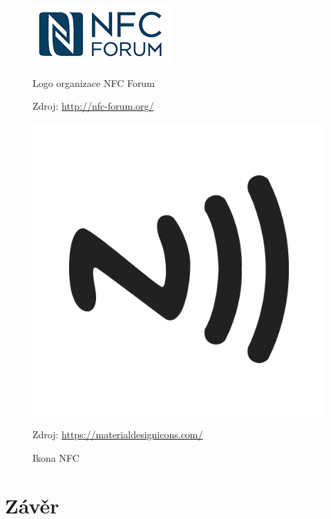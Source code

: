 \documentclass{article}
\begin{document}
\begin{figure}[H]
\begin{minipage}{.5\textwidth}
\centering
                \includegraphics[scale=0.4]{img/nfc-forum-logo.png}
        \caption{Logo organizace NFC Forum}
        \label{fig:nfcforumlogo}
        \centering Zdroj: \url{http://nfc-forum.org/}
\end{minipage}
\begin{minipage}{.5\textwidth}
\centering
                \includegraphics[scale=0.07]{img/nfc-icon.png}
        \caption{Ikona NFC}
        \centering Zdroj: \url{https://materialdesignicons.com/}
        \label{fig:nfcicon}
    \end{minipage}
\end{figure}


\section{Závěr}
\end{document}
